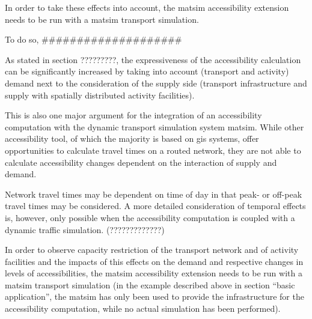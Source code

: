 
In order to take these effects into account, the \gls{matsim} accessibility extension 
needs to be run with a \gls{matsim} transport simulation.

To do so, ####################


As stated in section ?????????, the expressiveness of the accessibility calculation can be significantly increased 
by taking into account (transport and activity) demand next to the consideration of the supply side (transport 
infrastructure and supply with spatially distributed activity facilities). 

This is also one major argument for the 
integration of an accessibility computation with the dynamic transport simulation system \gls{matsim}. While other 
accessibility tool, of which the majority is based on \gls{gis} systems, offer opportunities to calculate travel times on 
a routed network, they are not able to calculate accessibility changes dependent on the interaction of supply and 
demand. 

Network travel times may be dependent on time of day in that \eg peak- or off-peak travel times may be 
considered. A more detailed consideration of temporal effects is, however, only possible when the accessibility 
computation is coupled with a dynamic traffic simulation. (?????????????)


In order to observe capacity restriction of the transport network and of activity facilities and the impacts of 
this effects on the demand and respective changes in levels of accessibilities, the \gls{matsim} accessibility 
extension needs to be run with a \gls{matsim} transport simulation (in the example described above in section ``basic 
application'', the \gls{matsim} has only been used to provide the infrastructure for the accessibility computation, 
while no actual simulation has been performed).

